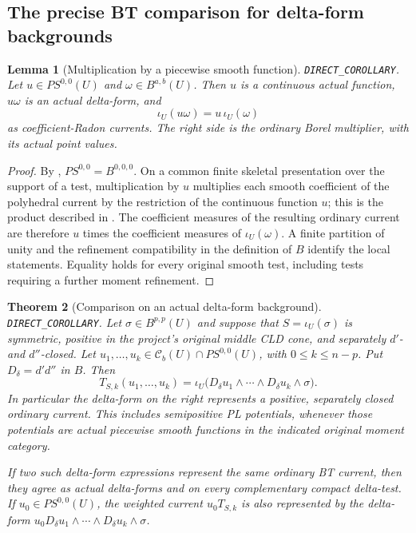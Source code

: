 \documentclass[11pt,a4paper]{article}
\numberwithin{equation}{section}
\newtheorem{theorem}{Theorem}[section]
\newtheorem{lemma}[theorem]{Lemma}
\theoremstyle{definition}
\theoremstyle{remark}
\begin{document}
\subsection{The precise BT comparison for delta-form backgrounds}

\begin{lemma}[Multiplication by a piecewise smooth function]
\label{lem:r6-pws-multiplier-delta-current}
\textnormal{\texttt{DIRECT\_COROLLARY}.}
Let $u\in PS^{0,0}(U)$ and $\omega\in B^{a,b}(U)$.  Then $u$ is a
continuous actual function, $u\omega$ is an actual delta-form, and
\[
                         \iota_U(u\omega)=u\,\iota_U(\omega)
\]
as coefficient-Radon currents.  The right side is the ordinary Borel
multiplier, with its actual point values.
\end{lemma}

\begin{proof}
By \cite[Proposition 4.7, printed p.~66]{Mih24},
$PS^{0,0}=B^{0,0,0}$.  On a common finite skeletal presentation over
the support of a test, multiplication by $u$ multiplies each smooth
coefficient of the polyhedral current by the restriction of the
continuous function $u$; this is the product described in
\cite[Remark 4.3(1), printed p.~61]{Mih24}.  The coefficient measures
of the resulting ordinary current are therefore $u$ times the
coefficient measures of $\iota_U(\omega)$.  A finite partition of unity
and the refinement compatibility in the definition of $B$ identify
the local statements.  Equality holds for every original smooth
test, including tests requiring a further moment refinement.
\end{proof}

\begin{theorem}[Comparison on an actual delta-form background]
\label{thm:r6-bt-delta-background-comparison}
\textnormal{\texttt{DIRECT\_COROLLARY}.}
Let $\sigma\in B^{p,p}(U)$ and suppose that
$S=\iota_U(\sigma)$ is symmetric, positive in the project's original
middle CLD cone, and separately $d'$- and $d''$-closed.  Let
$u_1,\ldots,u_k\in\mathcal C_b(U)\cap PS^{0,0}(U)$, with
$0\leq k\leq n-p$.  Put $D_\delta=d'd''$ in $B$.  Then
\begin{equation}
 T_{S,k}(u_1,\ldots,u_k)
   =\iota_U\bigl(D_\delta u_1\wedge\cdots\wedge
                       D_\delta u_k\wedge\sigma\bigr).
 \label{eq:r6-bt-delta-background}
\end{equation}
In particular the delta-form on the right represents a positive,
separately closed ordinary current.  This includes semipositive PL
potentials, whenever those potentials are actual piecewise smooth
functions in the indicated original moment category.

If two such delta-form expressions represent the same ordinary BT
current, then they agree as actual delta-forms and on every
complementary compact delta-test.  If $u_0\in PS^{0,0}(U)$, the
weighted current $u_0T_{S,k}$ is also represented by the delta-form
$u_0D_\delta u_1\wedge\cdots\wedge D_\delta u_k\wedge\sigma$.
\end{theorem}
\end{document}
